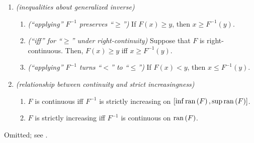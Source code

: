 \begin{enumerate}
\begin{enumerate}
\begin{enumerate}
\end{enumerate}
\item \emph{(inequalities about generalized inverse)}
\begin{enumerate}
\item \emph{(``applying'' \(F^{-1}\) preserves ``\(\ge\)'')} If \(F(x)\ge y\), then \(x\ge F^{-1}(y)\).
\item \emph{(``iff'' for ``\(\ge\)'' under right-continuity)} Suppose that
\(F\) is right-continuous. Then, \(F(x)\ge y\) iff \(x\ge F^{-1}(y)\).
\item \emph{(``applying'' \(F^{-1}\) turns ``\(<\)'' to ``\(\le\)'')} If \(F(x)<y\), then \(x\le F^{-1}(y)\).
\end{enumerate}
\item \emph{(relationship between continuity and strict increasingness)}
\begin{enumerate}
\item \(F\) is continuous iff \(F^{-1}\) is strictly increasing on \([\inf\operatorname{ran}\left(F\right),\sup\operatorname{ran}\left(F\right)]\).
\item \(F\) is strictly increasing iff \(F^{-1}\) is continuous on \(\operatorname{ran}\left(F\right)\).
\end{enumerate}
\end{enumerate}
\begin{pf}
Omitted; see \textcite{embrechts2013note}.
\end{pf}
\end{enumerate}
